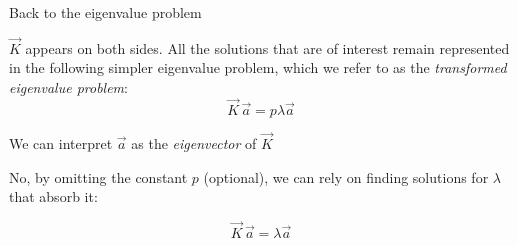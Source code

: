 \begin{frame}{Back to the eigenvalue problem}



\pause

$\vec K$ appears on both sides. All the solutions that are of interest remain represented in 
the following simpler eigenvalue problem, which we refer to as the \emph{transformed eigenvalue problem}:
\begin{equation}
\label{eq:eigsimple1}
	\vec{K} \, \vec{a} = p \lambda \vec{a}
\end{equation}

\pause

We can interpret $\vec a$ as the \emph{eigenvector} of $\vec K$

\pause


\pause

No, by omitting the constant $p$ (optional), we can rely on finding solutions for $\lambda$ that absorb it:

\begin{equation}
\label{eq:eigsimple2}
	\vec{K} \, \vec{a} = \lambda \vec{a}
\end{equation}

\end{frame}


